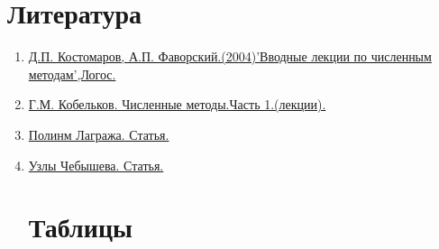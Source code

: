 \documentclass[13pt, a4paper, twoside]{article}
\begin{document}
\section{Литература}
\begin{enumerate}
    \item \href{https://ftp.vtyulb.ru/Костомаров.%20Вводные%20лекции%20по%20ЧМ.pdf}{Д.П. Костомаров, А.П. Фаворский.(2004)'Вводные лекции по численным методам',Логос.}

    \item \href{https://teach-in.ru/file/synopsis/pdf/numerical-methods-part-1-M.pdf}{Г.М. Кобельков. Численные методы.Часть 1.(лекции).}
    \item \href{https://en.wikipedia.org/wiki/Lagrange_polynomial}{Полинм Лагража. Статья.}
    \item \href{https://en.wikipedia.org/wiki/Chebyshev_nodes}{Узлы Чебышева. Статья.}

\section{Таблицы}
\end{enumerate}
\end{document}
